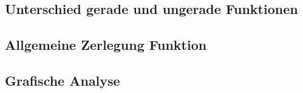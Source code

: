\subsection{Unterschied gerade und ungerade Funktionen}
\label{sec:diffrence-even-odd}


\subsection{Allgemeine Zerlegung Funktion}
\label{sec:common-fracturation}


\subsection{Grafische Analyse}
\label{sec:graphical-analysis}
